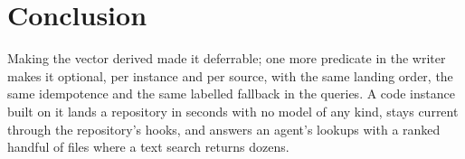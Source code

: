 \documentclass[11pt]{article}
\theoremstyle{plain}
\theoremstyle{definition}
\theoremstyle{remark}
\begin{document}
\section{Conclusion}

Making the vector derived made it deferrable; one more predicate in the writer makes it optional,
per instance and per source, with the same landing order, the same idempotence and the same
labelled fallback in the queries. A code instance built on it lands a repository in seconds with
no model of any kind, stays current through the repository's hooks, and answers an agent's lookups
with a ranked handful of files where a text search returns dozens.



\end{document}
